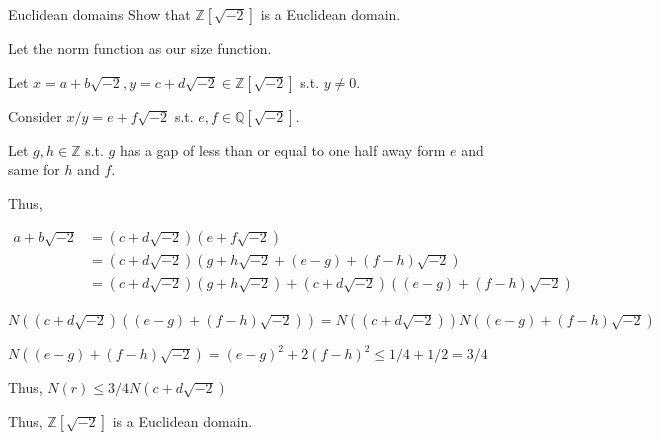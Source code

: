 \documentclass[12pt, letterpaper]{article}
\newcommand{\Q}{\mathbb{Q}}
\newcommand{\Z}{\mathbb{Z}}
\begin{document}
\begin{problem}{Euclidean domains}
    Show that $\Z [\sqrt{-2}]$ is a Euclidean domain.
\end{problem}
\begin{problemproof}
    Let the norm function as our size function.

    Let $x=a+b\sqrt{-2},y=c+d\sqrt{-2} \in \Z[\sqrt{-2}]$ s.t. $y \neq 0$.

    Consider $x/y=e+f\sqrt{-2}$ s.t. $e,f \in \Q[\sqrt{-2}]$.

    Let $g,h \in \Z$ s.t. $g$ has a gap of less than or equal to one half away form $e$ and same for $h$ and $f$.

    Thus,

    \begin{align*}
        a+b\sqrt{-2}&=(c+d\sqrt{-2})(e+f\sqrt{-2})\\
        &=(c+d\sqrt{-2})(g+h\sqrt{-2}+(e-g)+(f-h)\sqrt{-2})\\
        &=(c+d\sqrt{-2})(g+h\sqrt{-2})+(c+d\sqrt{-2})((e-g)+(f-h)\sqrt{-2})
    \end{align*}

    $N((c+d\sqrt{-2})((e-g)+(f-h)\sqrt{-2}))=N((c+d\sqrt{-2}))N((e-g)+(f-h)\sqrt{-2})$

    $N((e-g)+(f-h)\sqrt{-2})=(e-g)^2+2(f-h)^2 \leq 1/4+1/2=3/4$

    Thus, $N(r)\leq3/4N(c+d\sqrt{-2})$

    Thus, $\Z[\sqrt{-2}]$ is a Euclidean domain.
\end{problemproof}
\end{document}
